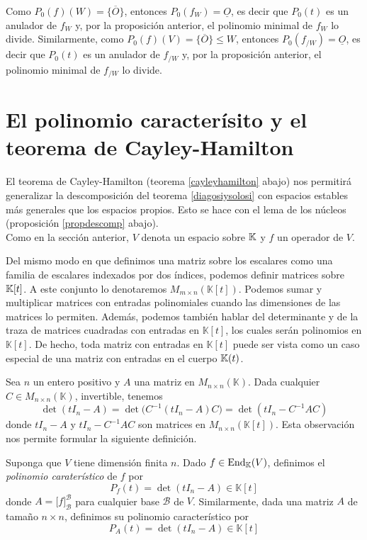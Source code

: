   \dem Como $P_0(f)(W)=\{\overline{O}\}$, entonces $P_0(f_W)=\underline{O}$, es decir que $P_0(t)$ es un anulador de $f_W$ y, por la proposición anterior, el polinomio minimal de $f_W$ lo divide. Similarmente, como $P_0(f)(V)=\{\overline{O}\}\le W$, entonces $P_0(f_{/W})=\underline{O}$, es decir que $P_0(t)$ es un anulador de $f_{/W}$ y, por la proposición anterior, el polinomio minimal de $f_{/W}$ lo divide.

\section{El polinomio caracterísito y el teorema de Cayley-Hamilton}

El teorema de Cayley-Hamilton (teorema \ref{cayleyhamilton} abajo) nos permitirá generalizar la descomposición del teorema \ref{diagosiysolosi} con espacios estables más generales que los espacios propios. Esto se hace con el lema de los núcleos (proposición \ref{propdescomp} abajo).\\
Como en la sección anterior, $V$ denota un espacio sobre $\mathbb{K}$ y $f$ un operador de $V$.

\begin{obs}
Del mismo modo en que definimos una matriz sobre los escalares como una familia de escalares indexados por dos índices, podemos definir matrices sobre $\mathbb{K}[t]$. A este conjunto lo denotaremos $M_{m\times n}(\mathbb{K}[t])$. Podemos sumar y multiplicar matrices con entradas polinomiales cuando las dimensiones de las matrices lo permiten. Además, podemos también hablar del determinante y de la traza de matrices cuadradas con entradas en $\mathbb{K}[t]$, los cuales ser\'an polinomios en $\mathbb{K}[t]$. De hecho, toda matriz con entradas en $\mathbb{K}[t]$ puede ser vista como un caso especial de una matriz con entradas en el cuerpo $\mathbb{K}(t)$.
\end{obs}

\begin{obs}
Sea $n$ un entero positivo y $A$ una matriz en $M_{n\times n}(\mathbb{K})$. Dada cualquier $C\in M_{n\times n}(\mathbb{K})$, invertible, tenemos
\[
\det(t I_n-A)=\det\Big(C^{-1}(t I_n-A)C\Big)=\det(t I_n-C^{-1}AC)
\]
donde $t I_n-A$ y $t I_n-C^{-1}AC$ son matrices en $M_{n\times n}(\mathbb{K}[t])$. Esta observaci\'on nos permite formular la siguiente definici\'on.
\end{obs}

\begin{defn}
Suponga que $V$ tiene dimensi\'on finita $n$. Dado $f\in\operatorname{End}_\mathbb{K}(V)$, definimos el \emph{polinomio carater\'istico} de $f$ por
\[
P_f(t)=\det(t I_n-A)\in \mathbb{K}[t]
\]
donde $A=\Big[f\Big]^{\mathcal{B}}_{\mathcal{B}}$ para cualquier base $\mathcal{B}$ de $V$. Similarmente, dada una matriz $A$ de tamaño $n\times n$, definimos su polinomio característico por
\[
P_A(t)=\det(t I_n-A)\in \mathbb{K}[t]
\]
\end{defn}

